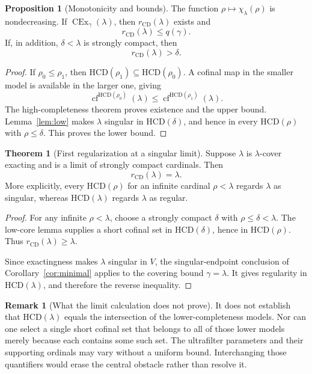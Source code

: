 \documentclass[11pt,letterpaper]{article}
\theoremstyle{definition}
\newtheorem{theorem}[definition]{Theorem}
\newtheorem{proposition}[definition]{Proposition}
\newcommand{\CEx}{\operatorname{CEx}}
\newcommand{\cf}{\operatorname{cf}}
\newcommand{\HCD}{\mathrm{HCD}}
\newcommand{\cfspec}{\chi}
\newcommand{\rcomp}{r_{\mathrm{CD}}}
\newtheorem{remark}[definition]{Remark}
\begin{document}
\begin{proposition}[Monotonicity and bounds]\label{prop:profile}
The function $\rho\mapsto\cfspec_\lambda(\rho)$ is nondecreasing. If $\CEx_\gamma(\lambda)$, then $\rcomp(\lambda)$ exists and
\[
 \rcomp(\lambda)\leq q(\gamma).
\]
If, in addition, $\delta<\lambda$ is strongly compact, then
\[
 \rcomp(\lambda)>\delta.
\]
\end{proposition}

\begin{proof}
If $\rho_0\leq\rho_1$, then $\HCD(\rho_1)\subseteq\HCD(\rho_0)$. A cofinal map in the smaller model is available in the larger one, giving
\[
 \cf^{\HCD(\rho_0)}(\lambda)
 \leq\cf^{\HCD(\rho_1)}(\lambda).
\]
The high-completeness theorem proves existence and the upper bound. Lemma~\ref{lem:low} makes $\lambda$ singular in $\HCD(\delta)$, and hence in every $\HCD(\rho)$ with $\rho\leq\delta$. This proves the lower bound.
\end{proof}

\begin{theorem}[First regularization at a singular limit]\label{thm:first}
Suppose $\lambda$ is $\lambda$-cover exacting and is a limit of strongly compact cardinals. Then
\[
 \rcomp(\lambda)=\lambda.
\]
More explicitly, every $\HCD(\rho)$ for an infinite cardinal $\rho<\lambda$ regards $\lambda$ as singular, whereas $\HCD(\lambda)$ regards $\lambda$ as regular.
\end{theorem}

\begin{proof}
For any infinite $\rho<\lambda$, choose a strongly compact $\delta$ with $\rho\leq\delta<\lambda$. The low-core lemma supplies a short cofinal set in $\HCD(\delta)$, hence in $\HCD(\rho)$. Thus $\rcomp(\lambda)\geq\lambda$.

Since exactingness makes $\lambda$ singular in $V$, the singular-endpoint conclusion of Corollary~\ref{cor:minimal} applies to the covering bound $\gamma=\lambda$. It gives regularity in $\HCD(\lambda)$, and therefore the reverse inequality.
\end{proof}

\begin{remark}[What the limit calculation does not prove]
It does not establish that $\HCD(\lambda)$ equals the intersection of the lower-completeness models. Nor can one select a single short cofinal set that belongs to all of those lower models merely because each contains some such set. The ultrafilter parameters and their supporting ordinals may vary without a uniform bound. Interchanging those quantifiers would erase the central obstacle rather than resolve it.
\end{remark}
\end{document}
